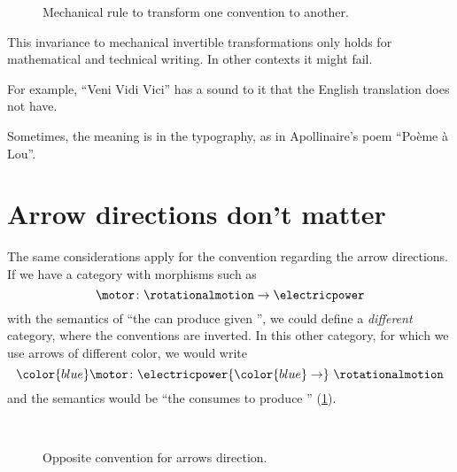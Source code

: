 \begin{figure*}[b]
    \hfill
    \caption{Mechanical rule to transform one convention to another.}
\end{figure*}

\vfill\clearpage
This invariance to mechanical invertible transformations only holds for mathematical and technical writing.
In other contexts it might fail.

For example, ``Veni Vidi Vici'' has a sound to it that the English translation does not have.

\begin{figure}[h!]
    \begin{center}
    \end{center}
\end{figure}

Sometimes, the meaning is in the typography, as in Apollinaire's poem ``Po\`eme \`a Lou''.

\begin{figure*}[h!]
    \begin{center}
    \end{center}
\end{figure*}

\section{Arrow directions don't matter}
The same considerations apply for the convention regarding the arrow directions.
If we have a category with morphisms such as
\begin{equation*}
    \motor \colon \rotationalmotion \to \electricpower
\end{equation*}
with the semantics of ``the \motor can produce \rotationalmotion given \electricpower'', we could define a \emph{different} category, where the conventions are inverted.
In this other category, for which we use arrows of different color, we would write
\begin{equation*}
    {\color{blue}\motor}
    \colon \electricpower {\color{blue} \to}\  \rotationalmotion
\end{equation*}
and the semantics would be ``the \motor consumes \electricpower to produce \rotationalmotion'' (\cref{fig:inverted}).

\begin{figure}[h!]
    \centering
    \\[+15pt]
    \caption{Opposite convention for arrows direction. }
    \label{fig:inverted}
\end{figure}

